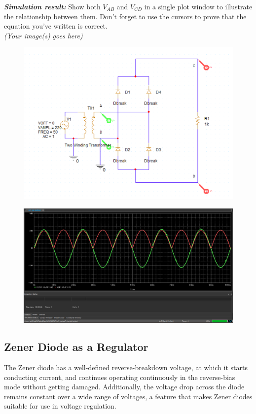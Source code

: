 \textbf{\textit{Simulation result:}}
Show both $V_{AB}$ and $V_{CD}$ in a single plot window to illustrate the relationship between them. Don't forget to use the cursors to prove that the equation you've written is correct.\\
\textit{(Your image(s) goes here)}\\
\begin{figure}[H]
    \centering
    \includegraphics[width=500px]{source/picture/bai_2/ex7_sim.png}
\end{figure}

\begin{figure}[H]
    \centering
    \includegraphics[width=500px]{source/picture/bai_2/ex7_plot.png}
\end{figure}
\newpage

\subsection{Zener Diode as a Regulator}
The Zener diode has a well-defined reverse-breakdown voltage, at which it starts conducting current, and continues operating continuously in the reverse-bias mode without getting damaged. Additionally, the voltage drop across the diode remains constant over a wide range of voltages, a feature that makes Zener diodes suitable for use in voltage regulation.

